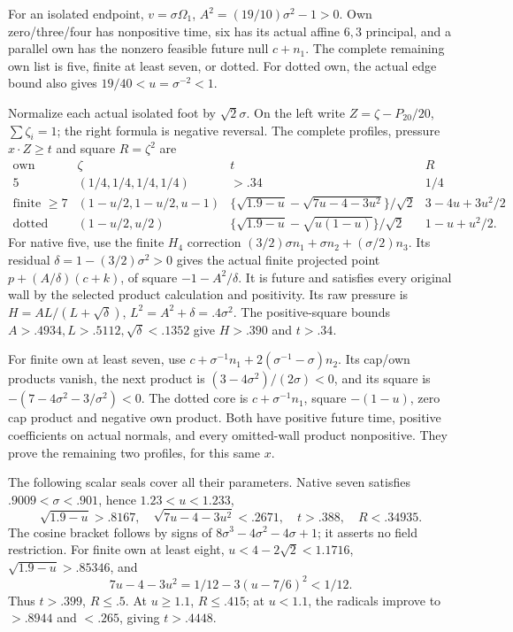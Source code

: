 \documentclass[11pt]{article}
\theoremstyle{definition}
\theoremstyle{remark}
\begin{document}
For an isolated endpoint,
\(v=\sigma\Omega_1\),
\(A^2=(19/10)\sigma^2-1>0\).
Own zero/three/four has nonpositive
time, six has its actual affine
\(6,3\) principal, and a parallel
own has the nonzero feasible future
null \(c+n_1\).
The complete remaining own list is
five, finite at least seven, or
dotted.
For dotted own, the actual edge
bound also gives \(19/40<u=\sigma^{-2}<1\).

Normalize each actual isolated foot
by \(\sqrt2\sigma\).
On the left write
\(Z=\zeta-P_{20}/20\), \(\sum\zeta_i=1\);
the right formula is negative reversal.
The complete profiles, pressure
\(x\cdot Z\ge t\) and square \(R=\zeta^2\)
are
\[
\begin{array}{c|c|c|c}
 \text{own}&\zeta&t&R\\ \hline
 5&(1/4,1/4,1/4,1/4)&>.34&1/4\\
 \text{finite }\ge7&(1-u/2,1-u/2,u-1)&
 \{\sqrt{1.9-u}-\sqrt{7u-4-3u^2}\}/\sqrt2&
                      3-4u+3u^2/2\\
 \text{dotted}&(1-u/2,u/2)&
 \{\sqrt{1.9-u}-\sqrt{u(1-u)}\}/\sqrt2&
                      1-u+u^2/2 .
\end{array}
\tag{A19endfeet}\label{app:exact19:eq:Aendfeet}
\]
For native five, use the finite
\(H_4\) correction
\((3/2)\sigma n_1+\sigma n_2+(\sigma/2)n_3\).
Its residual
\(\delta=1-(3/2)\sigma^2>0\)
gives the actual finite projected
point \(p+(A/\delta)(c+k)\),
of square \(-1-A^2/\delta\).
It is future and satisfies every
original wall by the selected
product calculation and positivity.
Its raw pressure is
\(H=AL/(L+\sqrt\delta)\),
\(L^2=A^2+\delta=.4\sigma^2\).
The positive-square bounds
\(A>.4934,L>.5112,\sqrt\delta<.1352\)
give \(H>.390\) and \(t>.34\).

For finite own at least seven,
use
\(c+\sigma^{-1}n_1+2(\sigma^{-1}-\sigma)n_2\).
Its cap/own products vanish, the
next product is
\((3-4\sigma^2)/(2\sigma)<0\),
and its square is
\(-(7-4\sigma^2-3/\sigma^2)<0\).
The dotted core is
\(c+\sigma^{-1}n_1\), square
\(-(1-u)\), zero cap product
and negative own product.
Both have positive future time,
positive coefficients on actual
normals, and every omitted-wall
product nonpositive.
They prove the remaining two
profiles, for this same \(x\).

The following scalar seals cover
all their parameters.
Native seven satisfies
\(.9009<\sigma<.901\), hence
\(1.23<u<1.233\),
\[
 \sqrt{1.9-u}>.8167,\quad
 \sqrt{7u-4-3u^2}<.2671,\quad
                             t>.388,\quad R<.34935 .
\]
The cosine bracket follows by signs
of \(8\sigma^3-4\sigma^2-4\sigma+1\);
it asserts no field restriction.
For finite own at least eight,
\(u<4-2\sqrt2<1.1716\),
\(\sqrt{1.9-u}>.85346\), and
\[
 7u-4-3u^2=1/12-3(u-7/6)^2<1/12 .
\]
Thus \(t>.399\), \(R\le.5\).
At \(u\ge1.1\), \(R\le.415\);
at \(u<1.1\), the radicals improve
to \(>.8944\) and \(<.265\),
giving \(t>.4448\).
\end{document}
